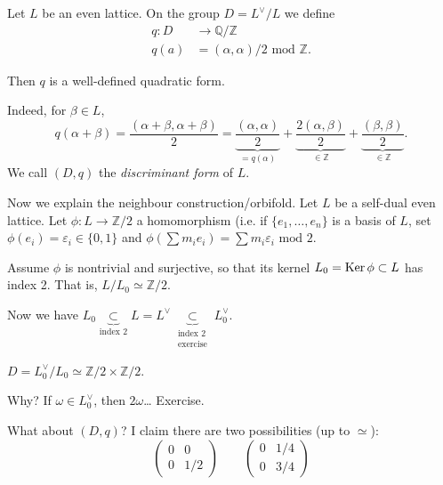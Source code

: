 \begin{remark}
\label{remark-discriminant-form}
Let $L$ be an even lattice.
On the group $D=L^\vee/L$ we define
\begin{align*}
q: D &\longrightarrow \mathbb{Q}/\mathbb{Z} \\
q(a) &=(\alpha,\alpha)/2 \text{ mod }\mathbb{Z}.
\end{align*}

\noindent
Then $q$ is a well-defined quadratic form.

Indeed, for $\beta \in L$,
$$
q(\alpha+\beta)=\frac{(\alpha+\beta,\alpha+\beta)}{2}
=\underbrace{\frac{(\alpha,\alpha)}{2}}_{=q(\alpha)}
+\underbrace{\frac{2(\alpha,\beta)}{2}}_{\in \mathbb{Z}}
+\underbrace{\frac{(\beta,\beta)}{2}}_{\in \mathbb{Z}}.
$$
We call $(D,q)$ the {\it discriminant form} of $L$.
\end{remark}

\medskip\noindent
Now we explain the neighbour construction/orbifold.
Let $L$ be a self-dual even lattice.
Let $\phi:L \to \mathbb{Z}/2$ a homomorphism
(i.e. if $\{e_1,\ldots,e_n\}$ is a basis of $L$,
set $\phi(e_i)=\varepsilon_i \in \{0,1\}$
and $\phi(\sum m_i e_i)=\sum m_i \varepsilon_i \text{ mod }2$.

Assume $\phi$ is nontrivial and surjective, so that its kernel
$L_0 = \mathop{\mathrm{Ker}} \phi \subset L$ has index 2.
That is, $L/L_0 \simeq \mathbb{Z}/2$.

Now we have $L_0 \underbrace{\subset }_{\text{index 2}}L 
= L^\vee \underbrace{\subset}_{\substack{\text{index 2} \\ \text{exercise}}}
L_0^\vee$.

\begin{remark}
\label{remark-discriminant-iso}
$D=L_0^\vee/L_0 \simeq \mathbb{Z}/2\times\mathbb{Z}/2$.
\end{remark}

\noindent
Why? If $\omega \in L_0^\vee$, then $2\omega$… Exercise.

What about $(D,q)$? I claim there are two possibilities
(up to $\simeq$):
\begin{equation}
\label{equation-cases}
\begin{pmatrix}
0&0\\ 
0&1/2
\end{pmatrix}\qquad 
\begin{pmatrix}
0&1/4\\ 
0&3/4
\end{pmatrix}
\end{equation}

